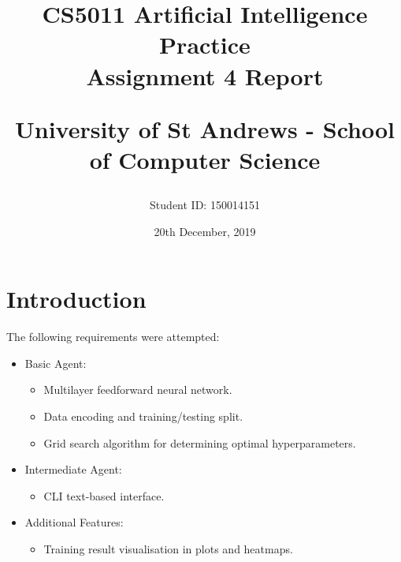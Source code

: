 \documentclass[letterpaper,12pt]{article}
\begin{document}
\title{
    CS5011 Artificial Intelligence Practice\\Assignment 4 Report\\
    \begin{large}
    University of St Andrews - School of Computer Science
    \end{large}
}
\author{Student ID: 150014151}
\date{20th December, 2019}
\maketitle
\newpage

\tableofcontents
\newpage



\section{Introduction}
\label{sec:introduction}

The following requirements were attempted:
\begin{itemize}
    \item Basic Agent:
    \begin{itemize}
        \item Multilayer feedforward neural network.
        \item Data encoding and training/testing split.
        \item Grid search algorithm for determining optimal hyperparameters.
    \end{itemize}
    \item Intermediate Agent:
    \begin{itemize}
        \item CLI text-based interface.
    \end{itemize}
    \item Additional Features:
    \begin{itemize}
        \item Training result visualisation in plots and heatmaps.
    \end{itemize}
        
\end{itemize}
\end{document}
